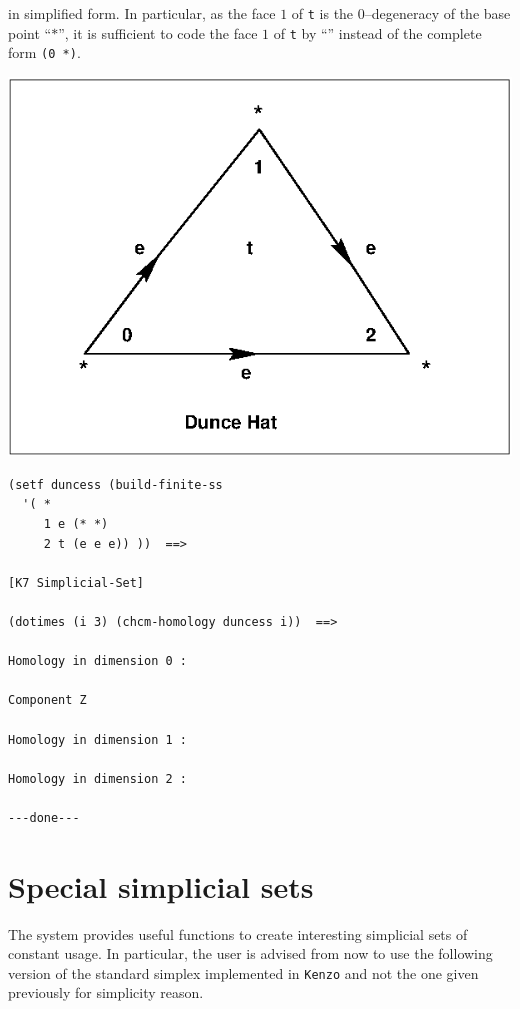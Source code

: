 in simplified form. In particular, as the face $1$ of {\tt t} is the $0$--degeneracy
of the base point ``$*$'', it is sufficient to code the  face $1$ of {\tt t}
by ``{\tt *}'' instead of the complete form {\tt (0 *)}.
\newpage
%
\vskip 0.40cm
\centerline{\includegraphics{duncess.eps}}
\vskip 0.40cm
%
{\footnotesize\begin{verbatim}
(setf duncess (build-finite-ss 
  '( *
     1 e (* *)
     2 t (e e e)) ))  ==>
 
[K7 Simplicial-Set]

(dotimes (i 3) (chcm-homology duncess i))  ==>

Homology in dimension 0 :

Component Z

Homology in dimension 1 :

Homology in dimension 2 :

---done---
\end{verbatim}}
\newpage

\section {Special simplicial sets}

The system provides useful functions to create interesting simplicial sets of constant usage.
In particular, the user is advised from now to use the following version of the standard
simplex implemented in {\tt Kenzo} and not the one given previously for simplicity reason. 

